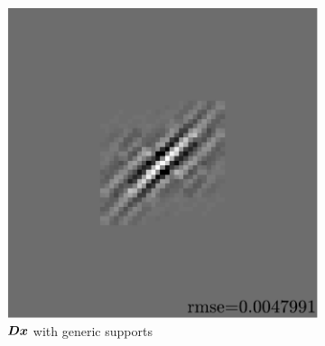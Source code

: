 \begin{figure}[!ht]
\begin{subfigure}[b]{0.09\textwidth}
	\caption{}
\end{subfigure}
\begin{subfigure}[b]{0.39\textwidth}\centering
	\includegraphics[width=\textwidth]{figures/exple-better-support/xp_128x128_sc2_angl1_K3_S3_node4classic_approx.pdf}
	\caption{$\bm{D}\bm{x}$ with generic supports}
\end{subfigure}
\begin{subfigure}[b]{0.09\textwidth}\centering

\end{subfigure}
\end{figure}
